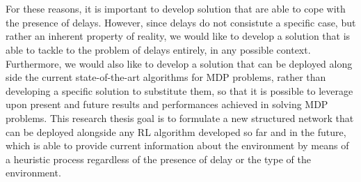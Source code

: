     \\\\
    For these reasons, it is important to develop solution that are able to cope with the presence of delays. However, since delays do not consistute a specific case, but rather an inherent property of reality, we would like to develop a solution that is able to tackle to the problem of delays entirely, in any possible context. Furthermore, we would also like to develop a solution that can be deployed along side the current state-of-the-art algorithms for MDP problems, rather than developing a specific solution to substitute them, so that it is possible to leverage upon present and future results and performances achieved in solving MDP problems. This research thesis goal is to formulate a new structured network that can be deployed alongside any RL algorithm developed so far and in the future, which is able to provide current information about the environment by means of a heuristic process regardless of the presence of delay or the type of the environment.